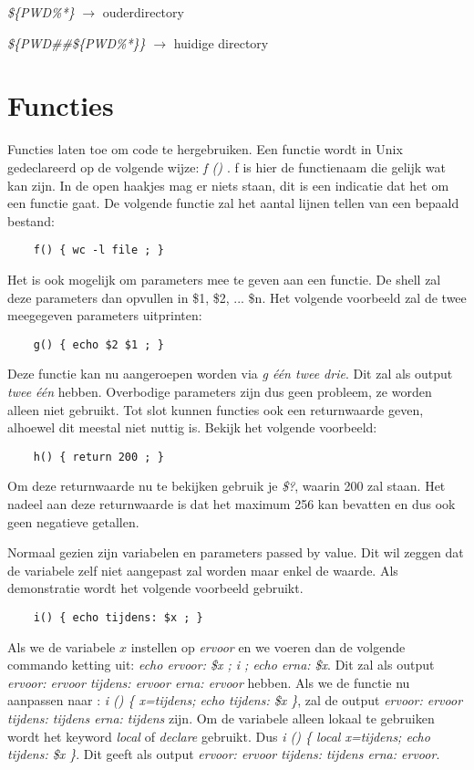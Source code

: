 \documentclass{report}
\begin{document}
\textit{\$\{PWD\%\/*\}} $\rightarrow$ ouderdirectory

\textit{\$\{PWD\#\#\$\{PWD\%\/*\}\/\}} $\rightarrow$ huidige directory



\section{Functies}
Functies laten toe om code te hergebruiken. Een functie wordt in Unix gedeclareerd op de volgende wijze: \textit{f () { }}. f is hier de functienaam die gelijk wat kan zijn. In de open haakjes mag er niets staan, dit is een indicatie dat het om een functie gaat. De volgende functie zal het aantal lijnen tellen van een bepaald bestand:
\begin{lstlisting}
	f() { wc -l file ; }
\end{lstlisting}
Het is ook mogelijk om parameters mee te geven aan een functie. De shell zal deze parameters dan opvullen in \$1, \$2, ... \$n. Het volgende voorbeeld zal de twee meegegeven parameters uitprinten:
\begin{lstlisting}
	g() { echo $2 $1 ; }
\end{lstlisting}
Deze functie kan nu aangeroepen worden via \textit{g één twee drie}. Dit zal als output \textit{twee één} hebben. Overbodige parameters zijn dus geen probleem, ze worden alleen niet gebruikt. Tot slot kunnen functies ook een returnwaarde geven, alhoewel dit meestal niet nuttig is. Bekijk het volgende voorbeeld:
\begin{lstlisting}
	h() { return 200 ; }
\end{lstlisting}
Om deze returnwaarde nu te bekijken gebruik je \textit{\$?}, waarin 200 zal staan. Het nadeel aan deze returnwaarde is dat het maximum 256 kan bevatten en dus ook geen negatieve getallen.

Normaal gezien zijn variabelen en parameters passed by value. Dit wil zeggen dat de variabele zelf niet aangepast zal worden maar enkel de waarde. Als demonstratie wordt het volgende voorbeeld gebruikt.
\begin{lstlisting}
	i() { echo tijdens: $x ; }
\end{lstlisting}
Als we de variabele $x$ instellen op \textit{ervoor} en we voeren dan de volgende commando ketting uit: \textit{echo ervoor: \$x ; i ; echo erna: \$x}. Dit zal als output \textit{ervoor: ervoor	tijdens: ervoor		erna: ervoor} hebben. Als we de functie nu aanpassen naar : \textit{i () \{ x=tijdens; echo tijdens: \$x \}}, zal de output \textit{ervoor: ervoor	tijdens: tijdens	erna: tijdens} zijn. Om de variabele alleen lokaal te gebruiken wordt het keyword \textit{local} of \textit{declare} gebruikt. Dus \textit{i () \{ local x=tijdens; echo tijdens: \$x \}}. Dit geeft als output \textit{ervoor: ervoor	tijdens: tijdens	erna: ervoor}.
\end{document}

